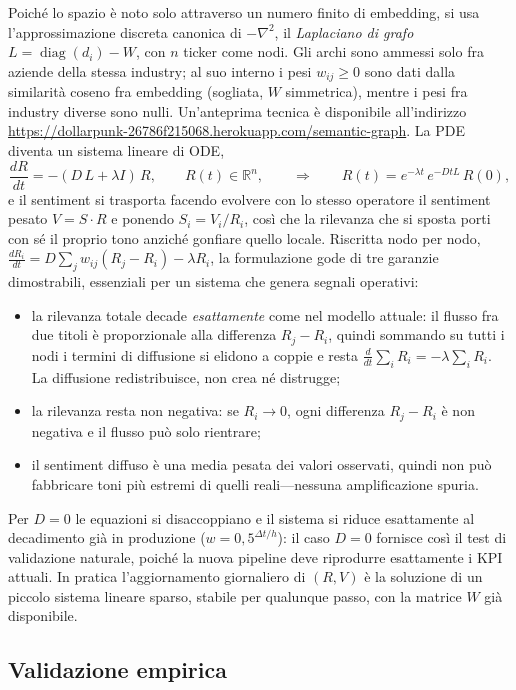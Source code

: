 \documentclass[a4paper,11pt]{article}
\begin{document}
Poiché lo spazio è noto solo attraverso un numero finito di embedding, si usa l'approssimazione discreta canonica di $-\nabla^2$, il \emph{Laplaciano di grafo} $L=\operatorname{diag}(d_i)-W$, con $n$ ticker come nodi. Gli archi sono ammessi solo fra aziende della stessa industry; al suo interno i pesi $w_{ij}\ge 0$ sono dati dalla similarità coseno fra embedding (sogliata, $W$ simmetrica), mentre i pesi fra industry diverse sono nulli. Un'anteprima tecnica è disponibile all'indirizzo \url{https://dollarpunk-26786f215068.herokuapp.com/semantic-graph}. La PDE diventa un sistema lineare di ODE,
\[
\frac{dR}{dt} = -(D\,L + \lambda I)\,R, \qquad R(t)\in\mathbb{R}^n,
\qquad\Longrightarrow\qquad
R(t)=e^{-\lambda t}\,e^{-D t L}\,R(0),
\]
e il sentiment si trasporta facendo evolvere con lo stesso operatore il sentiment pesato $V=S\cdot R$ e ponendo $S_i=V_i/R_i$, così che la rilevanza che si sposta porti con sé il proprio tono anziché gonfiare quello locale. Riscritta nodo per nodo, $\frac{dR_i}{dt}=D\sum_j w_{ij}(R_j-R_i)-\lambda R_i$, la formulazione gode di tre garanzie dimostrabili, essenziali per un sistema che genera segnali operativi:
\begin{itemize}\setlength\itemsep{0.1em}
  \item la rilevanza totale decade \emph{esattamente} come nel modello attuale: il flusso fra due titoli è proporzionale alla differenza $R_j-R_i$, quindi sommando su tutti i nodi i termini di diffusione si elidono a coppie e resta $\frac{d}{dt}\sum_i R_i=-\lambda\sum_i R_i$. La diffusione redistribuisce, non crea né distrugge;
  \item la rilevanza resta non negativa: se $R_i\to 0$, ogni differenza $R_j-R_i$ è non negativa e il flusso può solo rientrare;
  \item il sentiment diffuso è una media pesata dei valori osservati, quindi non può fabbricare toni più estremi di quelli reali---nessuna amplificazione spuria.
\end{itemize}
Per $D=0$ le equazioni si disaccoppiano e il sistema si riduce esattamente al decadimento già in produzione ($w=0{,}5^{\Delta t/h}$): il caso $D=0$ fornisce così il test di validazione naturale, poiché la nuova pipeline deve riprodurre esattamente i KPI attuali. In pratica l'aggiornamento giornaliero di $(R,V)$ è la soluzione di un piccolo sistema lineare sparso, stabile per qualunque passo, con la matrice $W$ già disponibile.

\subsection{Validazione empirica}
\end{document}
